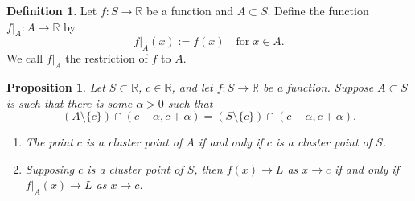 \documentclass{article}
\newtheorem{prop}[theorem]{Proposition}
\theoremstyle{definition}
\newtheorem{defi}{Definition}[section]
\begin{document}
\begin{defi}
    Let \( f: S \rightarrow \mathbb{R} \) be a function and \( A \subset S \). Define the function \( f|_A: A \rightarrow \mathbb{R} \) by
    \[ f|_A(x) := f(x) \quad \text{for} \; x \in A. \]
    We call \( f|_A \) the restriction of \( f \) to \( A \).    
\end{defi}

\begin{prop}
    Let \( S \subset \mathbb{R} \), \( c \in \mathbb{R} \), and let \( f: S \rightarrow \mathbb{R} \) be a function. Suppose \( A \subset S \) is such that there is some \( \alpha > 0 \) such that
\[ (A \setminus \{c\}) \cap (c - \alpha, c + \alpha) = (S \setminus \{c\}) \cap (c - \alpha, c + \alpha). \]

\begin{enumerate}[label=(\roman*)]
    \item The point \( c \) is a cluster point of \( A \) if and only if \( c \) is a cluster point of \( S \).
    \item Supposing \( c \) is a cluster point of \( S \), then \( f(x) \rightarrow L \) as \( x \rightarrow c \) if and only if \( f|_A(x) \rightarrow L \) as \( x \rightarrow c \).
\end{enumerate}
\end{prop}
\end{document}
